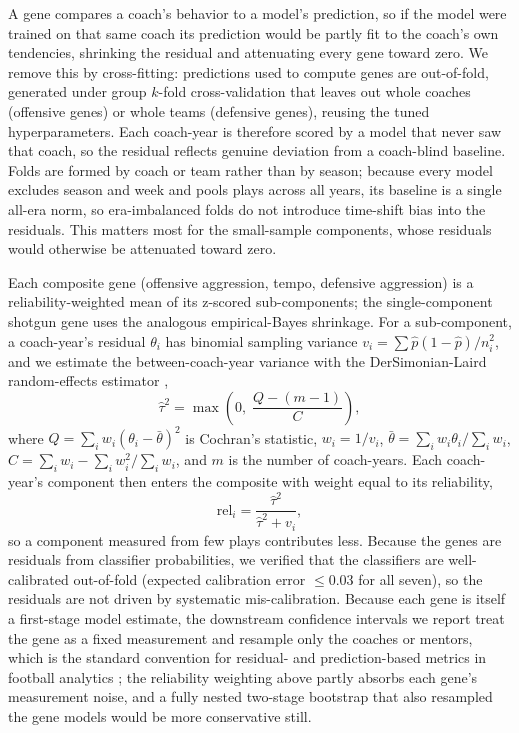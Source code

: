 \documentclass[USenglish]{article}
\theoremstyle{dgthm}
\theoremstyle{dgdef}
\begin{document}
A gene compares a coach's behavior to a model's prediction, so if the model were trained on that same coach its prediction would be partly fit to the coach's own tendencies, shrinking the residual and attenuating every gene toward zero. We remove this by cross-fitting: predictions used to compute genes are out-of-fold, generated under group $k$-fold cross-validation that leaves out whole coaches (offensive genes) or whole teams (defensive genes), reusing the tuned hyperparameters. Each coach-year is therefore scored by a model that never saw that coach, so the residual reflects genuine deviation from a coach-blind baseline. Folds are formed by coach or team rather than by season; because every model excludes season and week and pools plays across all years, its baseline is a single all-era norm, so era-imbalanced folds do not introduce time-shift bias into the residuals. This matters most for the small-sample components, whose residuals would otherwise be attenuated toward zero.

Each composite gene (offensive aggression, tempo, defensive aggression) is a reliability-weighted mean of its z-scored sub-components; the single-component shotgun gene uses the analogous empirical-Bayes shrinkage. For a sub-component, a coach-year's residual $\theta_i$ has binomial sampling variance $v_i = \sum \hat{p}(1-\hat{p})/n_i^2$, and we estimate the between-coach-year variance with the DerSimonian-Laird random-effects estimator \citep{dersimonian1986},
\begin{equation}
\hat{\tau}^2 = \max\!\left(0,\; \frac{Q - (m-1)}{C}\right),
\end{equation}
where $Q = \sum_i w_i(\theta_i - \bar{\theta})^2$ is Cochran's statistic, $w_i = 1/v_i$, $\bar{\theta} = \sum_i w_i \theta_i / \sum_i w_i$, $C = \sum_i w_i - \sum_i w_i^2 / \sum_i w_i$, and $m$ is the number of coach-years. Each coach-year's component then enters the composite with weight equal to its reliability,
\begin{equation}
\mathrm{rel}_i = \frac{\hat{\tau}^2}{\hat{\tau}^2 + v_i},
\end{equation}
so a component measured from few plays contributes less. Because the genes are residuals from classifier probabilities, we verified that the classifiers are well-calibrated out-of-fold (expected calibration error $\leq 0.03$ for all seven), so the residuals are not driven by systematic mis-calibration. Because each gene is itself a first-stage model estimate, the downstream confidence intervals we report treat the gene as a fixed measurement and resample only the coaches or mentors, which is the standard convention for residual- and prediction-based metrics in football analytics \citep{yurko2019}; the reliability weighting above partly absorbs each gene's measurement noise, and a fully nested two-stage bootstrap that also resampled the gene models would be more conservative still.
\end{document}
